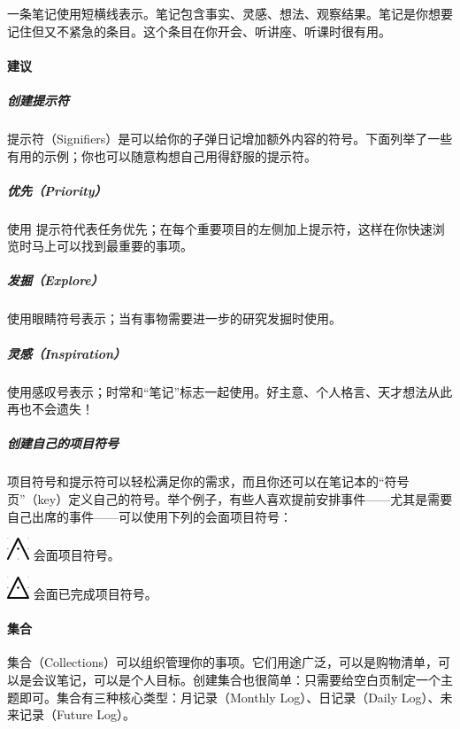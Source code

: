 \documentclass[a5paper]{article}
\begin{document}
一条笔记使用短横线\textendash 表示。笔记包含事实、灵感、想法、观察结果。笔记是你想要记住但又不紧急的条目。这个条目在你开会、听讲座、听课时很有用。

\clearpage

\paragraph{建议}

\subparagraph{创建提示符}

提示符（Signifiers）是可以给你的子弹日记增加额外内容的符号。下面列举了一些有用的示例；你也可以随意构想自己用得舒服的提示符。

\subparagraph{优先（Priority）}

使用 \textasteriskcentered 提示符代表任务优先；在每个重要项目的左侧加上提示符，这样在你快速浏览时马上可以找到最重要的事项。

\subparagraph{发掘（Explore）}

使用眼睛符号表示；当有事物需要进一步的研究发掘时使用。

\subparagraph{灵感（Inspiration）}

使用感叹号表示；时常和“笔记”标志一起使用。好主意、个人格言、天才想法从此再也不会遗失！

\subparagraph{创建自己的项目符号}

项目符号和提示符可以轻松满足你的需求，而且你还可以在笔记本的“符号页”（key）定义自己的符号。举个例子，有些人喜欢提前安排事件——尤其是需要自己出席的事件——可以使用下列的会面项目符号：

\protect\includegraphics[width=0.05\textwidth]{image/appointment-bullet.pdf} 会面项目符号。

\protect\includegraphics[width=0.05\textwidth]{image/appointment-complete.pdf} 会面已完成项目符号。

\clearpage

\paragraph{集合}

集合（Collections）可以组织管理你的事项。它们用途广泛，可以是购物清单，可以是会议笔记，可以是个人目标。创建集合也很简单：只需要给空白页制定一个主题即可。集合有三种核心类型：月记录（Monthly Log）、日记录（Daily Log）、未来记录（Future Log）。
\end{document}
